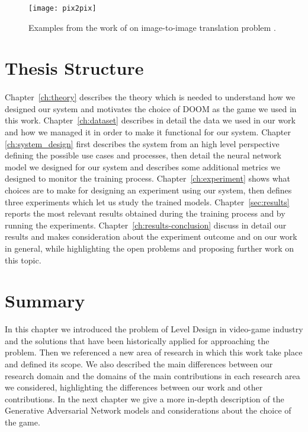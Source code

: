 \begin{figure}[h!]
	\begin{center}
		\texttt{[image: pix2pix]}
	\end{center}
	
	\captionsetup{width=1\linewidth}
	\caption[Pix2Pix example from \citeauthor{image-to-image}]{Examples from the work of \citeauthor{image-to-image} on image-to-image translation problem \cite{image-to-image}.}
	\label{fig:img-to-img}
	\medskip
	
\end{figure}



\section{Thesis Structure}
\paragraph{} Chapter~\ref{ch:theory} describes the theory which is needed to understand how we designed our system and motivates the choice of DOOM as the game we used in this work. Chapter~\ref{ch:dataset} describes in detail the data we used in our work and how we managed it in order to make it functional for our system. Chapter \ref{ch:system_design} first describes the system from an high level perspective defining the possible use cases and processes, then detail the neural network model we designed for our system and describes some additional metrics we designed to monitor the training process. Chapter~\ref{ch:experiment} shows what choices are to make for designing an experiment using our system, then defines three experiments which let us study the trained models. Chapter~\ref{sec:results} reports the most relevant results obtained during the training process and by running the experiments. Chapter~\ref{ch:results-conclusion} discuss in detail our results and makes consideration about the experiment outcome and on our work in general, while highlighting the open problems and proposing further work on this topic.

\section{Summary}
In this chapter we introduced the problem of Level Design in video-game industry and the solutions that have been historically applied for approaching the problem. Then we referenced a new area of research in which this work take place and defined its scope.
We also described the main differences between our research domain and the domains of the main contributions in each research area we considered, highlighting the differences between our work and other contributions. In the next chapter we give a more in-depth description of the Generative Adversarial Network models and considerations about the choice of the game. 
